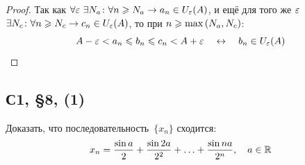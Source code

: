 \documentclass[a4paper,12pt]{article}
\begin{document}
  \begin{proof}
    Так как $\forall \eps\ \exists N_a\colon \forall n \hm\geq N_a \hm\to a_n \hm\in U_{\eps}(A)$, и ещё для того же $\varepsilon$ $\exists N_c\colon \forall n \hm\geq N_c \hm\to c_n \hm\in U_{\eps}(A)$, то при $n \hm\geq \max{(N_a, N_c)}$:
    \[
      A - \varepsilon < a_n \leqslant b_n \leqslant c_n < A + \varepsilon
      \quad\leftrightarrow\quad b_n \in U_{\varepsilon}(A)
    \]
  \end{proof}
  
  
  \subsection{С1, \S 8, (1)}
  
  Доказать, что последовательность~$\{x_n\}$ сходится:
  \[
    x_n = \frac{\sin a}{2} + \frac{\sin{2a}}{2^2} + \ldots + \frac{\sin{na}}{2^n},\quad a \in \operatorname{\mathbb R}
  \]
  
\end{document}
